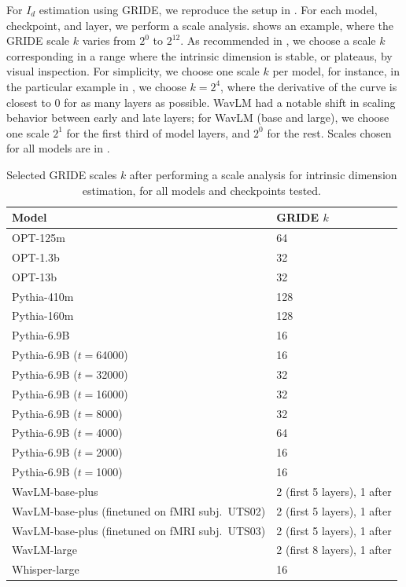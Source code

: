 \documentclass{article}
\theoremstyle{plain}
\theoremstyle{definition}
\theoremstyle{remark}
\begin{document}
For $I_d$ estimation using GRIDE, we reproduce the setup in \citet{cheng2025emergence}. For each model, checkpoint, and layer, we perform a scale analysis.  shows an example, where the GRIDE scale $k$ varies from $2^0$ to $2^{12}$. As recommended in \citet{Denti_Doimo_Laio_Mira_2022}, we choose a scale $k$ corresponding in a range where the intrinsic dimension is stable, or plateaus, by visual inspection. For simplicity, we choose one scale $k$ per model, for instance, in the particular example in , we choose $k=2^4$, where the derivative of the curve is closest to 0 for as many layers as possible. 
WavLM had a notable shift in scaling behavior between early and late layers; for WavLM (base and large), we choose one scale $2^1$ for the first third of model layers, and $2^0$ for the rest. Scales chosen for all models are in . 

\begin{table}[]    
\caption{Selected GRIDE scales $k$ after performing a scale analysis for intrinsic dimension estimation, for all models and checkpoints tested.}
    \centering
    \begin{tabular}{l|l}
        Model & GRIDE $k$ \\
        \hline 
        OPT-125m & 64 \\
        OPT-1.3b & 32 \\
        OPT-13b & 32 \\
        Pythia-410m & 128 \\
        Pythia-160m & 128 \\
        Pythia-6.9B & 16 \\
        Pythia-6.9B ($t=$64000) & 16 \\
        Pythia-6.9B ($t=$32000) & 32 \\
        Pythia-6.9B ($t=$16000) & 32 \\
        Pythia-6.9B ($t=$8000) & 32 \\
        Pythia-6.9B ($t=$4000) & 64 \\
        Pythia-6.9B ($t=$2000) & 16 \\
        Pythia-6.9B ($t=$1000) & 16 \\
        WavLM-base-plus & 2 (first 5 layers), 1 after \\
        WavLM-base-plus (finetuned on fMRI subj.~UTS02) & 2 (first 5 layers), 1 after\\
        WavLM-base-plus (finetuned on fMRI subj.~UTS03) & 2 (first 5 layers), 1 after\\
        WavLM-large & 2 (first 8 layers), 1 after \\
        Whisper-large & 16 \\
    \end{tabular}
    \label{tab:scales}
\end{table}
\end{document}
